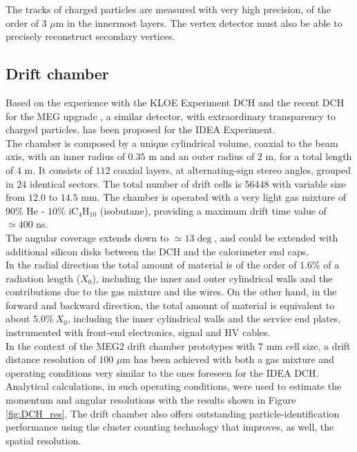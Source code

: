 The tracks of charged particles are measured with very high precision, of the order of $3$ $\mu$m in the innermost layers. The vertex detector must also be able to precisely reconstruct secondary vertices.

\subsection{Drift chamber}
Based on the experience with the KLOE Experiment DCH \cite{KLOE} and the recent DCH for the MEG upgrade \cite{MEG2}, a similar detector, with extraordinary transparency to charged particles, has been proposed for the IDEA Experiment.\\

The chamber is composed by a unique cylindrical volume, coaxial to the beam axis, with an inner radius of $0.35$ m and an outer radius of $2$ m, for a total length of $4$ m. It consists of $112$ coaxial layers, at alternating-sign stereo angles, grouped in $24$ identical sectors. The total number of drift cells is $56448$ with variable size from $12.0$ to $14.5$ mm.
The chamber is operated with a very light gas mixture of $90\%$ He - $10\%$ iC$_4$H$_{10}$ (isobutane), providing a maximum drift time value of $\simeq 400$ ns.\\
The angular coverage extends down to $\simeq 13\deg$, and could be extended with additional silicon disks between the DCH and the calorimeter end caps.\\
In the radial direction the total amount of material is of the order of $1.6\%$ of a radiation length ($X_0$), including the inner and outer cylindrical walls and the contributions due to the gas mixture and the wires. On the other hand, in the forward and backward direction, the total amount of material is equivalent to about $5.0\%\ X_0$, including the inner cylindrical walls and the service end plates, instrumented with front-end electronics, signal and HV cables.\\

In the context of the MEG2 drift chamber prototypes \cite{MEG2} with $7$ mm cell size, a drift distance resolution of $100$ $\mu$m has been achieved with both a gas mixture and operating conditions very similar to the ones foreseen for the IDEA DCH.
Analytical calculations, in such operating conditions, were used to estimate the momentum and angular resolutions with the results shown in Figure \ref{fig:DCH_res}.
The drift chamber also offers outstanding particle-identification performance using the cluster counting technology that improves, as well, the spatial resolution.

